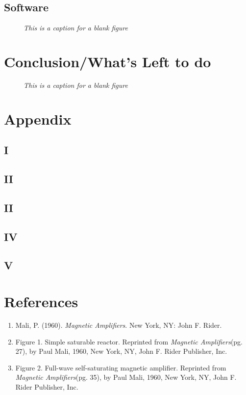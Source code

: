 \documentclass[11pt]{article}
\begin{document}
\subsection{Software}

\blindtext

    \begin{figure}[H]
	\centering	
	\caption{\textit{This is a caption for a blank figure}}	
	\end{figure}



\section{Conclusion/What's Left to do}

\blindtext


     \begin{figure}[H]
	\centering	
	\caption{\textit{This is a caption for a blank figure}}	
	\end{figure}

\pagebreak

\section{Appendix}
\subsection{I}
\subsection{II}
\subsection{II}
\subsection{IV}
\subsection{V}	

\pagebreak

\section{References}
\begin{enumerate}
\item Mali, P. (1960).\textit{ Magnetic Amplifiers}. New York, NY: John F. Rider.
\item Figure 1. Simple saturable reactor. Reprinted from \textit{Magnetic Amplifiers}(pg. 27), by Paul Mali, 1960, New York, NY, John F. Rider Publisher, Inc.
\item Figure 2. Full-wave self-saturating magnetic amplifier. Reprinted from \textit{Magnetic Amplifiers}(pg. 35), by Paul Mali, 1960, New York, NY, John F. Rider Publisher, Inc.
\end{enumerate}	
\end{document}
